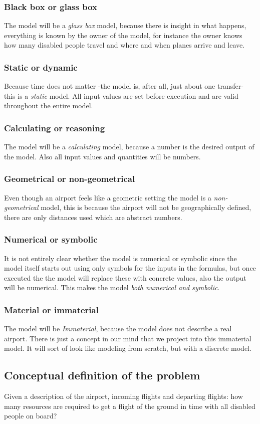 \documentclass[a4paper, 12pt, notitlepage]{report}
\begin{document}
\subsubsection{Black box or glass box}
The model will be a \emph{glass box} model, because there is insight in what happens, everything is known by the owner of the model, for instance the owner knows how many disabled people travel and where and when planes arrive and leave.
\subsubsection{Static or dynamic}
Because time does not matter -the model is, after all, just about one transfer- this is a \emph{static} model. All input values are set before execution and are valid throughout the entire model.
\subsubsection{Calculating or reasoning}
The model will be a \emph{calculating} model, because a number is the desired output of the model. Also all input values and quantities will be numbers.
\subsubsection{Geometrical or non-geometrical}
Even though an airport feels like a geometric setting the model is a \emph{non-geometrical} model, this is because the airport will not be geographically defined, there are only distances used which are abstract numbers.
\subsubsection{Numerical or symbolic}
It is not entirely clear whether the model is numerical or symbolic since the model itself starts out using only symbols for the inputs in the formulas, but once executed the the model will replace these with concrete values, also the output will be numerical. This makes the model \emph{both numerical and symbolic}.
\subsubsection{Material or immaterial}
The model will be \emph{Immaterial}, because the model does not describe a real airport. There is just a concept in our mind that we project into this immaterial model. It will sort of look like modeling from scratch, but with a discrete model.
\subsection{Conceptual definition of the problem}
Given a description of the airport, incoming flights and departing flights: how many resources are required to get a flight of the ground in time with all disabled people on board?
\end{document}
